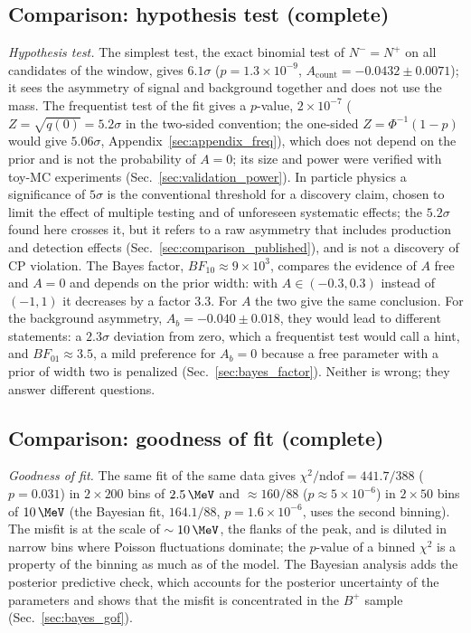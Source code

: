\subsection{Comparison: hypothesis test (complete)}
\emph{Hypothesis test.} The simplest test, the exact binomial test of $N^-=N^+$ on all candidates of the window, gives $6.1\sigma$ ($p=1.3\times10^{-9}$, $A_{\mathrm{count}}=-0.0432\pm0.0071$); it sees the asymmetry of signal and background together and does not use the mass. The frequentist test of the fit gives a $p$-value, $2\times10^{-7}$ ($Z=\sqrt{q(0)}=5.2\sigma$ in the two-sided convention; the one-sided $Z=\Phi^{-1}(1-p)$ would give $5.06\sigma$, Appendix~\ref{sec:appendix_freq}), which does not depend on the prior and is not the probability of $A=0$; its size and power were verified with toy-MC experiments (Sec.~\ref{sec:validation_power}). In particle physics a significance of $5\sigma$ is the conventional threshold for a discovery claim, chosen to limit the effect of multiple testing and of unforeseen systematic effects; the $5.2\sigma$ found here crosses it, but it refers to a raw asymmetry that includes production and detection effects (Sec.~\ref{sec:comparison_published}), and is not a discovery of CP violation. The Bayes factor, $BF_{10}\approx9\times10^3$, compares the evidence of $A$ free and $A=0$ and depends on the prior width: with $A\in(-0.3,0.3)$ instead of $(-1,1)$ it decreases by a factor $3.3$. For $A$ the two give the same conclusion. For the background asymmetry, $A_b=-0.040\pm0.018$, they would lead to different statements: a $2.3\sigma$ deviation from zero, which a frequentist test would call a hint, and $BF_{01}\approx3.5$, a mild preference for $A_b=0$ because a free parameter with a prior of width two is penalized (Sec.~\ref{sec:bayes_factor}). Neither is wrong; they answer different questions.

\subsection{Comparison: goodness of fit (complete)}
\emph{Goodness of fit.} The same fit of the same data gives $\chi^2/\mathrm{ndof}=441.7/388$ ($p=0.031$) in $2\times200$ bins of $2.5\,\MeV$ and $\approx160/88$ ($p\approx5\times10^{-6}$) in $2\times50$ bins of $10\,\MeV$ (the Bayesian fit, $164.1/88$, $p=1.6\times10^{-6}$, uses the second binning). The misfit is at the scale of $\sim10\,\MeV$, the flanks of the peak, and is diluted in narrow bins where Poisson fluctuations dominate; the $p$-value of a binned $\chi^2$ is a property of the binning as much as of the model. The Bayesian analysis adds the posterior predictive check, which accounts for the posterior uncertainty of the parameters and shows that the misfit is concentrated in the $B^+$ sample (Sec.~\ref{sec:bayes_gof}).

